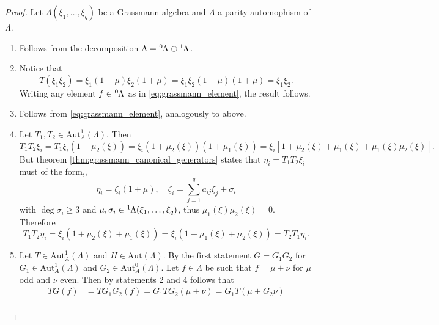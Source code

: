 \documentclass{article}
\theoremstyle{definition}
\begin{document}
\begin{proof}
    Let $\Lambda(\xi_1, \dots, \xi_q)$ be a Grassmann algebra and $A$ a parity automophism of $\Lambda$.
    \begin{enumerate}
        \item Follows from the decomposition $\Lambda = \tensor[^0]{\Lambda}{} \oplus \tensor[^1]{\Lambda}{}$.
        \item Notice that
        \begin{equation*}
            T(\xi_1 \xi_2) = \xi_1(1 + \mu)\xi_2(1 + \mu) = \xi_1 \xi_2 (1 - \mu)(1 + \mu) = \xi_1 \xi_2.
        \end{equation*}
        Writing any element $f \in \tensor[^0]{\Lambda}{}$ as in \eqref{eq:grassmann_element}, the result follows.
        \item Follows from \eqref{eq:grassmann_element}, analogously to above.
        \item Let $T_1, T_2 \in \text{Aut}_A^1(\Lambda)$. Then
        \begin{equation*}
            T_1 T_2 \xi_i = T_1 \xi_i (1 + \mu_2(\xi))
            = \xi_i(1 + \mu_2(\xi))(1 + \mu_1(\xi))
            = \xi_i \left[1 + \mu_2(\xi) + \mu_1(\xi) + \mu_1(\xi) \mu_2(\xi) \right].
        \end{equation*}
        But theorem \ref{thm:grassmann_canonical_generators} states that $\eta_i = T_1 T_2 \xi_i$ must of the form,,
        \begin{equation*}
            \eta_i = \zeta_i ( 1 + \mu), \quad \zeta_i = \sum_{j = 1}^q a_{ij} \xi_j + \sigma_i
        \end{equation*}
        with $\deg \sigma_i \geq 3$ and $\mu, \sigma_i \in \tensor[^1]{\Lambda(\xi_1, \dots, \xi_q)}{}$, thus $\mu_1(\xi) \mu_2(\xi) = 0$. Therefore
        \begin{equation*}
            T_1 T_2 \eta_i = \xi_i(1 + \mu_2(\xi) + \mu_1(\xi)) = \xi_i(1 + \mu_1(\xi) + \mu_2(\xi)) = T_2 T_1 \eta_i.
        \end{equation*}
        \item Let $T \in \text{Aut}_A^1(\Lambda)$ and $H \in \text{Aut}(\Lambda)$. By the first statement $G = G_1 G_2$ for $G_1 \in \text{Aut}_A^1(\Lambda)$ and $G_2 \in \text{Aut}_A^0(\Lambda)$. Let $f \in \Lambda$ be such that $f = \mu + \nu$ for $\mu$ odd and $\nu$ even. Then by statements 2 and 4 follows that
        \begin{align*}
            T G(f) &= T G_1 G_2(f) = G_1 T G_2 (\mu + \nu) = G_1 T (\mu + G_2 \nu) \\

\end{align*}
\end{enumerate}
\end{proof}
\end{document}
